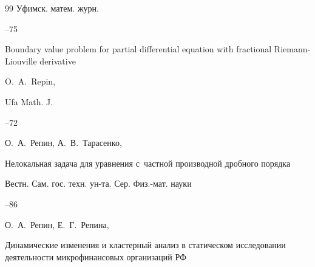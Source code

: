 \begin{thebibliography}{99}
\jour Уфимск. матем. журн.




--75



\transl 

\paper Boundary value problem for partial differential equation with fractional Riemann-Liouville derivative

\by \linebreak O.~A.~Repin,

\jour Ufa Math. J.




--72







\by О.~А.~Репин, А.~В.~Тарасенко,

\paper Нелокальная задача для уравнения с~частной производной дробного порядка

\jour Вестн. Сам. гос. техн. ун-та. Сер. Физ.-мат. науки




--86








\by О.~А.~Репин, Е.~Г.~Репина,

\paper Динамические изменения и кластерный анализ в статическом исследовании деятельности микрофинансовых организаций РФ 


\end{thebibliography}
